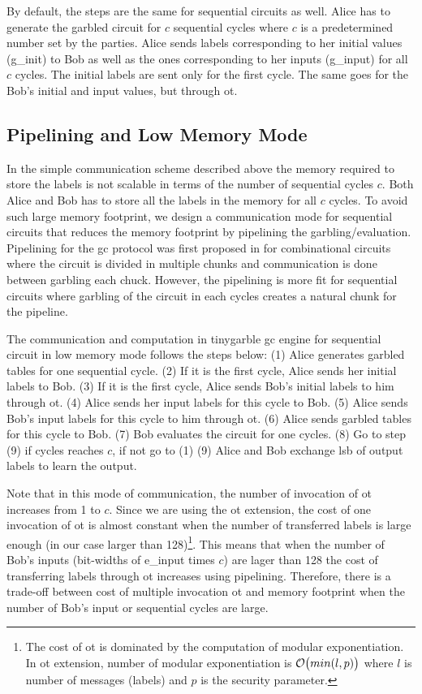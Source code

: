 By default, the steps are the same for sequential circuits as well.
Alice has to generate the garbled circuit for $c$ sequential cycles where $c$ is a predetermined number set by the parties.
Alice sends labels corresponding to her initial values (g\_init) to Bob as well as the ones corresponding to her inputs (g\_input) for all $c$ cycles.
The initial labels are sent only for the first cycle.
The same goes for the Bob's initial and input values, but through \acrshort{ot}.

\subsection{Pipelining and Low Memory Mode}\label{sec:engine-memory}
In the simple communication scheme described above the memory required to store the labels is not scalable in terms of the number of sequential cycles $c$.
Both Alice and Bob has to store all the labels in the memory for all $c$ cycles.
To avoid such large memory footprint, we design a communication mode for sequential circuits that reduces the memory footprint by pipelining the garbling/evaluation.
Pipelining for the \acrshort{gc} protocol was first proposed in \cite{husted2013gpu} for combinational circuits where the circuit is divided in multiple chunks and communication is done between garbling each chuck.
However, the pipelining is more fit for sequential circuits where garbling of the circuit in each cycles creates a natural chunk for the pipeline.

The communication and computation in \gls{tinygarble} \acrshort{gc} engine for sequential circuit in low memory mode follows the steps below:
(1) Alice generates garbled tables for one sequential cycle.
(2) If it is the first cycle, Alice sends her initial labels to Bob.
(3) If it is the first cycle, Alice sends Bob's initial labels to him through \acrshort{ot}.
(4) Alice sends her input labels for this cycle to Bob.
(5) Alice sends Bob's input labels for this cycle to him through \acrshort{ot}.
(6) Alice sends garbled tables for this cycle to Bob.
(7) Bob evaluates the circuit for one cycles.
(8) Go to step (9) if cycles reaches $c$, if not go to (1)
(9) Alice and Bob exchange \acrshort{lsb} of output labels to learn the output.

Note that in this mode of communication, the number of invocation of \acrshort{ot} increases from 1 to $c$.
Since we are using the \acrshort{ot} extension, the cost of one invocation of \acrshort{ot} is almost constant when the number of transferred labels is large enough (in our case larger than 128)\footnote{The cost of \acrshort{ot} is dominated by the computation of modular exponentiation. In \acrshort{ot} extension, number of modular exponentiation is $\mathcal{O}\bigl(min(l, p)\bigr)$ where $l$ is number of messages (labels) and $p$ is the security parameter.}.
This means that when the number of Bob's inputs (bit-widths of e\_input times $c$) are lager than 128 the cost of transferring labels through \acrshort{ot} increases using pipelining.
Therefore, there is a trade-off between cost of multiple invocation \acrshort{ot} and memory footprint when the number of Bob's input or sequential cycles are large.

